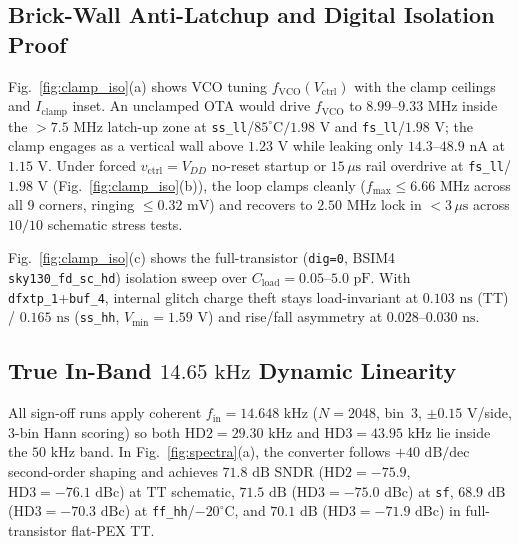 \documentclass[10pt,twocolumn,letterpaper]{article}
\begin{document}
\subsection{Brick-Wall Anti-Latchup and Digital Isolation Proof}
Fig.~\ref{fig:clamp_iso}(a) shows VCO tuning $f_{\text{VCO}}(V_{\text{ctrl}})$ with the clamp ceilings and $I_{\text{clamp}}$ inset. An unclamped OTA would drive $f_{\text{VCO}}$ to $8.99$--$9.33\text{ MHz}$ inside the $>7.5\text{ MHz}$ latch-up zone at \texttt{ss\_ll}/$85^\circ\text{C}/1.98\text{ V}$ and \texttt{fs\_ll}/$1.98\text{ V}$; the clamp engages as a vertical wall above $1.23\text{ V}$ while leaking only $14.3$--$48.9\text{ nA}$ at $1.15\text{ V}$. Under forced $v_{\text{ctrl}}=V_{DD}$ no-reset startup or $15\,\mu\text{s}$ rail overdrive at \texttt{fs\_ll}/$1.98\text{ V}$ (Fig.~\ref{fig:clamp_iso}(b)), the loop clamps cleanly ($f_{\max}\le6.66\text{ MHz}$ across all 9 corners, ringing $\le0.32\text{ mV}$) and recovers to $2.50\text{ MHz}$ lock in $<3\,\mu\text{s}$ across $10/10$ schematic stress tests.

Fig.~\ref{fig:clamp_iso}(c) shows the full-transistor (\texttt{dig=0}, BSIM4 \texttt{sky130\_fd\_sc\_hd}) isolation sweep over $C_{\text{load}}=0.05$--$5.0\text{ pF}$. With \texttt{dfxtp\_1}+\texttt{buf\_4}, internal glitch charge theft stays load-invariant at $0.103\text{ ns}$ (TT) / $0.165\text{ ns}$ (\texttt{ss\_hh}, $V_{\min}=1.59\text{ V}$) and rise/fall asymmetry at $0.028$--$0.030\text{ ns}$.

\subsection{True In-Band \texorpdfstring{$14.65\text{ kHz}$}{14.65 kHz} Dynamic Linearity}
All sign-off runs apply coherent $f_{\text{in}}=14.648\text{ kHz}$ ($N=2048$, bin~3, $\pm0.15\text{ V}$/side, 3-bin Hann scoring) so both $\text{HD2}=29.30\text{ kHz}$ and $\text{HD3}=43.95\text{ kHz}$ lie inside the $50\text{ kHz}$ band. In Fig.~\ref{fig:spectra}(a), the converter follows $+40\text{ dB/dec}$ second-order shaping and achieves $71.8\text{ dB}$ SNDR ($\text{HD2}=-75.9$, $\text{HD3}=-76.1\text{ dBc}$) at TT schematic, $71.5\text{ dB}$ ($\text{HD3}=-75.0\text{ dBc}$) at \texttt{sf}, $68.9\text{ dB}$ ($\text{HD3}=-70.3\text{ dBc}$) at \texttt{ff\_hh}/$-20^\circ\text{C}$, and $70.1\text{ dB}$ ($\text{HD3}=-71.9\text{ dBc}$) in full-transistor flat-PEX TT.
\end{document}
